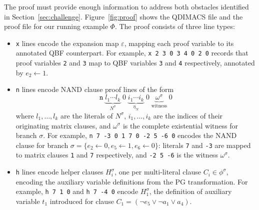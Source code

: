 \documentclass{article}
\begin{document}
The proof must provide enough information to address both obstacles identified in
Section~\ref{sec:challenge}. Figure~\ref{fig:proof} shows the QDIMACS file and
the proof file for our running example $\Phi$. The proof consists of three line
types:
\begin{itemize}
    \item \texttt{x} lines encode the expansion map $\varepsilon$, mapping each
          proof variable to its annotated QBF counterpart. For example, \texttt{x 2 3
              0 3 4 0 2 0} records that proof variables \texttt{2} and \texttt{3} map to
          QBF variables \texttt{3} and \texttt{4} respectively, annotated by $e_2
              \leftarrow 1$.
    \item \texttt{n} lines encode NAND clause proof lines of the form
          \[
              \texttt{n} \;
              \underbrace{l_1 \cdots l_k}_{N^\sigma} \; 0 \;
              \underbrace{i_1 \cdots i_k}_{\eta_N} \; 0 \;
              \underbrace{\omega^\sigma}_{\text{witness}} \; 0
          \]
          where $l_1, \ldots, l_k$ are the literals of $N^\sigma$, $i_1, \ldots,
              i_k$ are the indices of their originating matrix clauses, and $\omega^\sigma$
          is the complete existential witness for branch $\sigma$. For example,
          \texttt{n 7 -3 0 1 7 0 -2 5 -6 0} encodes the NAND clause for branch
          $\sigma = \{e_2 \leftarrow 0, e_5 \leftarrow 1, e_6 \leftarrow 0\}$:
          literals \texttt{7} and \texttt{-3} are mapped to matrix clauses \texttt{1}
          and \texttt{7} respectively, and \texttt{-2 5 -6} is the witness
          $\omega^\sigma$.
    \item \texttt{h} lines encode helper clauses $H_i^\sigma$, one per multi-literal
          clause $C_i \in \phi^\sigma$, encoding the auxiliary variable definitions
          from the PG transformation. For example, \texttt{h 7 1 0} and \texttt{h 7
              -4 0} encode $H_1^\sigma$, the definition of auxiliary variable $t_1$
          introduced for clause $C_1 = (\neg e_5 \vee \neg a_1 \vee a_4)$.
\end{itemize}
\end{document}
